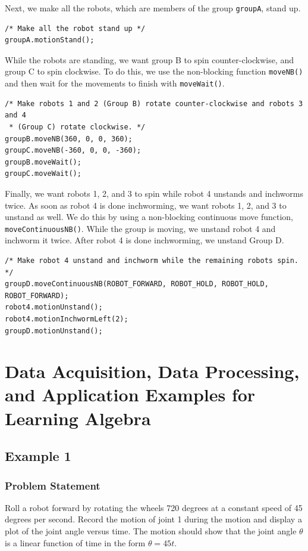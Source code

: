 \documentclass{article}
\begin{document}
Next, we make all the robots, which are members of the group \texttt{groupA}, 
stand up.
\begin{verbatim}
/* Make all the robot stand up */
groupA.motionStand();
\end{verbatim}

While the robots are standing, we want group B to spin counter-clockwise, and group
C to spin clockwise. To do this, we use the non-blocking function \texttt{moveNB()}
and then wait for the movements to finish with \texttt{moveWait()}.
\begin{verbatim}
/* Make robots 1 and 2 (Group B) rotate counter-clockwise and robots 3 and 4
 * (Group C) rotate clockwise. */
groupB.moveNB(360, 0, 0, 360);
groupC.moveNB(-360, 0, 0, -360);
groupB.moveWait();
groupC.moveWait();
\end{verbatim}

Finally, we want robots 1, 2, and 3 to spin while robot 4 unstands and inchworms twice.
As soon as robot 4 is done inchworming, we want robots 1, 2, and 3 to unstand as well.
We do this by using a non-blocking continuous move function, \texttt{moveContinuousNB()}.
While the group is moving, we unstand robot 4 and inchworm it twice. After robot 4 is
done inchworming, we unstand Group D.
\begin{verbatim}
/* Make robot 4 unstand and inchworm while the remaining robots spin. */
groupD.moveContinuousNB(ROBOT_FORWARD, ROBOT_HOLD, ROBOT_HOLD, ROBOT_FORWARD);
robot4.motionUnstand();
robot4.motionInchwormLeft(2);
groupD.motionUnstand();
\end{verbatim}

\section{Data Acquisition, Data Processing, and Application Examples for Learning Algebra}
\subsection{Example 1}
\subsubsection{Problem Statement}
Roll a robot forward by rotating the wheels 720 degrees at a constant speed of 45 degrees per
second. Record the motion of joint 1 during the motion and display a plot
of the joint angle versus time. The motion should show that the joint angle $\theta$
is a linear function of time in the form $\theta = 45t$.
\end{document}
